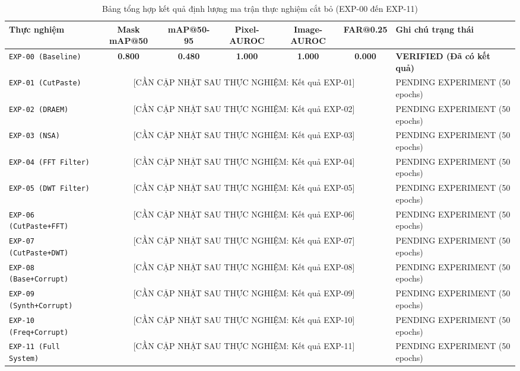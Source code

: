 \begin{table}[h]
\centering
\caption{Bảng tổng hợp kết quả định lượng ma trận thực nghiệm cắt bỏ (EXP-00 đến EXP-11)}
\label{tab:ablation_results}
\begin{tabularx}{\textwidth}{l c c c c c X}
\toprule
\textbf{Thực nghiệm} & \textbf{Mask mAP@50} & \textbf{mAP@50-95} & \textbf{Pixel-AUROC} & \textbf{Image-AUROC} & \textbf{FAR@0.25} & \textbf{Ghi chú trạng thái} \\
\midrule
\texttt{EXP-00 (Baseline)} & \textbf{0.800} & \textbf{0.480} & \textbf{1.000} & \textbf{1.000} & \textbf{0.000} & \textbf{VERIFIED (Đã có kết quả)} \\
\texttt{EXP-01 (CutPaste)} & \multicolumn{5}{c}{[CẦN CẬP NHẬT SAU THỰC NGHIỆM: Kết quả EXP-01]} & PENDING EXPERIMENT (50 epochs) \\
\texttt{EXP-02 (DRAEM)} & \multicolumn{5}{c}{[CẦN CẬP NHẬT SAU THỰC NGHIỆM: Kết quả EXP-02]} & PENDING EXPERIMENT (50 epochs) \\
\texttt{EXP-03 (NSA)} & \multicolumn{5}{c}{[CẦN CẬP NHẬT SAU THỰC NGHIỆM: Kết quả EXP-03]} & PENDING EXPERIMENT (50 epochs) \\
\texttt{EXP-04 (FFT Filter)} & \multicolumn{5}{c}{[CẦN CẬP NHẬT SAU THỰC NGHIỆM: Kết quả EXP-04]} & PENDING EXPERIMENT (50 epochs) \\
\texttt{EXP-05 (DWT Filter)} & \multicolumn{5}{c}{[CẦN CẬP NHẬT SAU THỰC NGHIỆM: Kết quả EXP-05]} & PENDING EXPERIMENT (50 epochs) \\
\texttt{EXP-06 (CutPaste+FFT)} & \multicolumn{5}{c}{[CẦN CẬP NHẬT SAU THỰC NGHIỆM: Kết quả EXP-06]} & PENDING EXPERIMENT (50 epochs) \\
\texttt{EXP-07 (CutPaste+DWT)} & \multicolumn{5}{c}{[CẦN CẬP NHẬT SAU THỰC NGHIỆM: Kết quả EXP-07]} & PENDING EXPERIMENT (50 epochs) \\
\texttt{EXP-08 (Base+Corrupt)} & \multicolumn{5}{c}{[CẦN CẬP NHẬT SAU THỰC NGHIỆM: Kết quả EXP-08]} & PENDING EXPERIMENT (50 epochs) \\
\texttt{EXP-09 (Synth+Corrupt)} & \multicolumn{5}{c}{[CẦN CẬP NHẬT SAU THỰC NGHIỆM: Kết quả EXP-09]} & PENDING EXPERIMENT (50 epochs) \\
\texttt{EXP-10 (Freq+Corrupt)} & \multicolumn{5}{c}{[CẦN CẬP NHẬT SAU THỰC NGHIỆM: Kết quả EXP-10]} & PENDING EXPERIMENT (50 epochs) \\
\texttt{EXP-11 (Full System)} & \multicolumn{5}{c}{[CẦN CẬP NHẬT SAU THỰC NGHIỆM: Kết quả EXP-11]} & PENDING EXPERIMENT (50 epochs) \\
\bottomrule
\end{tabularx}
\end{table}

